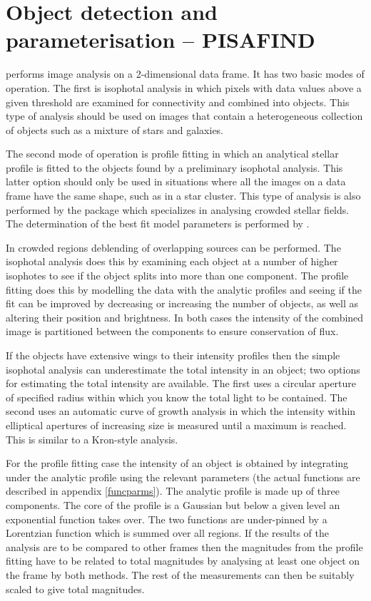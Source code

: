 \section{Object detection and parameterisation -- PISAFIND}

 performs image analysis on a 2-dimensional data frame. It has
two basic modes of operation. The first is isophotal analysis in
which pixels with data values above a given threshold are examined for
connectivity and combined into objects. This type of analysis should be
used on images that contain a heterogeneous collection of objects such
as a mixture of stars and galaxies.

The second mode of operation is profile fitting in which an analytical
stellar profile is fitted to the objects found by a preliminary
isophotal analysis. This latter option should only be used in
situations where all the images on a data frame have the same shape,
such as in a star cluster. This type of analysis is also performed by
the  package which specializes in analysing
crowded stellar fields.  The determination of the best fit model
parameters is performed by .

In crowded regions deblending of overlapping sources can be performed.
The isophotal analysis does this by examining each object at a number of
higher isophotes to see if the object splits into more than one
component. The profile fitting does this by modelling the data with the
analytic profiles and seeing if the fit can be improved by decreasing or
increasing the number of objects, as well as altering their position and
brightness. In both cases the intensity of the combined image is
partitioned between the components to ensure conservation of flux.

If the objects have extensive wings to their intensity profiles then the
simple isophotal analysis can underestimate the total intensity in an
object; two options for estimating the total intensity are available.
The first uses a circular aperture of specified radius within which you
know the total light to be contained. The second uses an automatic
curve of growth analysis in which the intensity within elliptical
apertures of increasing size is measured until a maximum is reached.
This is similar to a Kron-style analysis.

For the profile fitting case the intensity of an object is obtained by
integrating under the analytic profile using the relevant parameters
(the actual functions are described in appendix \ref{funcparms}). The
analytic profile is made up of three components. The core of the profile
is a Gaussian but below a given level an exponential function
takes over. The two functions are under-pinned by a Lorentzian function
which is summed over all regions. If the results of the analysis are to
be compared to other frames then the magnitudes from the profile fitting
have to be related to total magnitudes by analysing at least one object
on the frame by both methods. The rest of the measurements can then be
suitably scaled to give total magnitudes.

